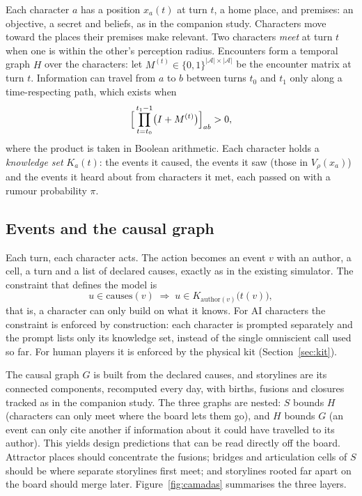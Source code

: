 \documentclass[11pt]{article}
\begin{document}
Each character $a$ has a position $x_a(t)$ at turn $t$, a home place, and
premises: an objective, a secret and beliefs, as in the companion study.
Characters move toward the places their premises make relevant. Two
characters \emph{meet} at turn $t$ when one is within the other's perception
radius. Encounters form a temporal graph $H$ over the characters: let
$M^{(t)} \in \{0,1\}^{|\mathcal{A}| \times |\mathcal{A}|}$ be the encounter
matrix at turn $t$. Information can travel from $a$ to $b$ between turns
$t_0$ and $t_1$ only along a time-respecting path, which exists when
\begin{equation}
  \Bigl[\,\prod_{t = t_0}^{t_1 - 1} \bigl(I + M^{(t)}\bigr)\Bigr]_{ab} > 0,
\end{equation}
where the product is taken in Boolean arithmetic. Each character holds a
\emph{knowledge set} $K_a(t)$: the events it caused, the events it saw (those
in $V_\rho(x_a)$) and the events it heard about from characters it met, each
passed on with a rumour probability $\pi$.

\subsection{Events and the causal graph}

Each turn, each character acts. The action becomes an event $v$ with an
author, a cell, a turn and a list of declared causes, exactly as in the
existing simulator. The constraint that defines the model is
\begin{equation}
  u \in \mathrm{causes}(v) \;\Rightarrow\; u \in K_{\mathrm{author}(v)}\bigl(t(v)\bigr),
\end{equation}
that is, a character can only build on what it knows. For AI characters the
constraint is enforced by construction: each character is prompted
separately and the prompt lists only its knowledge set, instead of the single
omniscient call used so far. For human players it is enforced by the
physical kit (Section~\ref{sec:kit}).

The causal graph $G$ is built from the declared causes, and storylines are
its connected components, recomputed every day, with births, fusions and
closures tracked as in the companion study. The three graphs are nested:
$S$ bounds $H$ (characters can only meet where the board lets them go), and
$H$ bounds $G$ (an event can only cite another if information about it could
have travelled to its author). This yields design predictions that can be
read directly off the board. Attractor places should concentrate the
fusions; bridges and articulation cells of $S$ should be where separate
storylines first meet; and storylines rooted far apart on the board should
merge later. Figure~\ref{fig:camadas} summarises the three layers.
\end{document}
